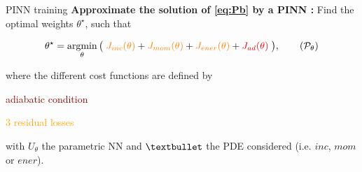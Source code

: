 \begin{appendixframe}{PINN training}
    \vspace{-4pt}
    \textbf{Approximate the solution of \eqref{eq:Pb} by a PINN :} Find the optimal weights $\theta^\star$, such that
	
    \vspace{-8pt}
    \begin{equation}
		\theta^\star = \argmin_{\theta}	\big( \; \textcolor{orange}{J_{inc}(\theta)} + \textcolor{orange}{J_{mom}(\theta)} + \textcolor{orange}{J_{ener}(\theta)} + \textcolor{darkred}{J_{ad}(\theta)} \; \big),
		\tag{$\mathcal{P}_\theta$}
	\end{equation}

    \vspace{-2pt}
	where the different cost functions are defined by
	\vspace{5pt}

	\begin{minipage}{0.24\linewidth}
		\centering
		\textcolor{darkred}{adiabatic condition}
        
		\vspace{12pt}
		\textcolor{orange}{$3$ residual losses}
	\end{minipage}
	\begin{minipage}{0.68\linewidth}
		\centering
        
        \vspace{3pt}
	\end{minipage}
    
    \vspace{5pt}
    with $U_\theta$ the parametric NN and $\textbullet$ the PDE considered (i.e. $inc$, $mom$ or $ener$).

    

\end{appendixframe}
